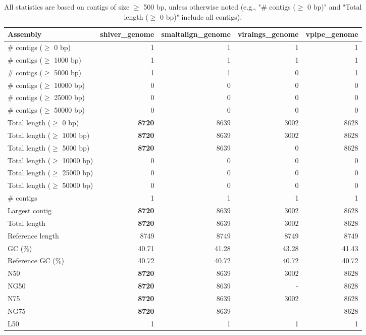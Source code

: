 \documentclass[12pt,a4paper]{article}
\begin{document}
\begin{table}[ht]
\begin{center}
\caption{All statistics are based on contigs of size $\geq$ 500 bp, unless otherwise noted (e.g., "\# contigs ($\geq$ 0 bp)" and "Total length ($\geq$ 0 bp)" include all contigs).}
\begin{tabular}{|l*{4}{|r}|}
\hline
Assembly & shiver\_genome & smaltalign\_genome & viralngs\_genome & vpipe\_genome \\ \hline
\# contigs ($\geq$ 0 bp) & 1 & 1 & 1 & 1 \\ \hline
\# contigs ($\geq$ 1000 bp) & 1 & 1 & 1 & 1 \\ \hline
\# contigs ($\geq$ 5000 bp) & 1 & 1 & 0 & 1 \\ \hline
\# contigs ($\geq$ 10000 bp) & 0 & 0 & 0 & 0 \\ \hline
\# contigs ($\geq$ 25000 bp) & 0 & 0 & 0 & 0 \\ \hline
\# contigs ($\geq$ 50000 bp) & 0 & 0 & 0 & 0 \\ \hline
Total length ($\geq$ 0 bp) & {\bf 8720} & 8639 & 3002 & 8628 \\ \hline
Total length ($\geq$ 1000 bp) & {\bf 8720} & 8639 & 3002 & 8628 \\ \hline
Total length ($\geq$ 5000 bp) & {\bf 8720} & 8639 & 0 & 8628 \\ \hline
Total length ($\geq$ 10000 bp) & 0 & 0 & 0 & 0 \\ \hline
Total length ($\geq$ 25000 bp) & 0 & 0 & 0 & 0 \\ \hline
Total length ($\geq$ 50000 bp) & 0 & 0 & 0 & 0 \\ \hline
\# contigs & 1 & 1 & 1 & 1 \\ \hline
Largest contig & {\bf 8720} & 8639 & 3002 & 8628 \\ \hline
Total length & {\bf 8720} & 8639 & 3002 & 8628 \\ \hline
Reference length & 8749 & 8749 & 8749 & 8749 \\ \hline
GC (\%) & 40.71 & 41.28 & 43.28 & 41.43 \\ \hline
Reference GC (\%) & 40.72 & 40.72 & 40.72 & 40.72 \\ \hline
N50 & {\bf 8720} & 8639 & 3002 & 8628 \\ \hline
NG50 & {\bf 8720} & 8639 & - & 8628 \\ \hline
N75 & {\bf 8720} & 8639 & 3002 & 8628 \\ \hline
NG75 & {\bf 8720} & 8639 & - & 8628 \\ \hline
L50 & 1 & 1 & 1 & 1 \\ \hline

\end{tabular}
\end{center}
\end{table}
\end{document}
